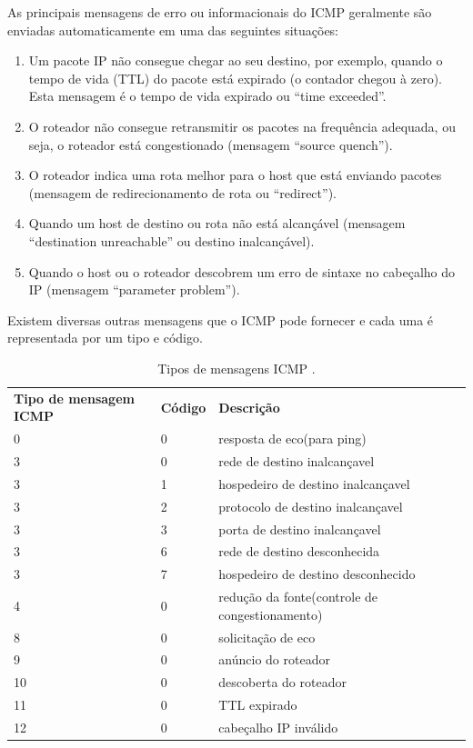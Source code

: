 \documentclass[
	article,			%
	11pt,				%
	oneside,			%
	a4paper,			%
	english,			%
	brazil,				%
	sumario=tradicional
	]{abntex2}
\begin{document}
 As principais mensagens de erro ou informacionais do ICMP geralmente são enviadas automaticamente em uma das seguintes situações:
 \begin{enumerate}
 	\item Um pacote IP não consegue chegar ao seu destino, por exemplo, quando o tempo de vida (TTL) do pacote está expirado (o contador chegou à zero). Esta mensagem é o tempo de vida expirado ou “time exceeded”.
 	
 	\item O roteador não consegue retransmitir os pacotes na frequência adequada, ou seja, o roteador está congestionado (mensagem “source quench”).
 	
 	\item O roteador indica uma rota melhor para o host que está enviando pacotes (mensagem de redirecionamento de rota ou “redirect”).
 	
 	\item Quando um host de destino ou rota não está alcançável (mensagem “destination unreachable” ou destino inalcançável).
 	
 	\item Quando o host ou o roteador descobrem um erro de sintaxe no cabeçalho do IP (mensagem “parameter problem”). 
 \end{enumerate}
	Existem diversas outras mensagens que o ICMP pode fornecer e cada uma é representada por um tipo e código.\cite{dltec}
 \begin{table}[H]
 	\centering
 	\caption{Tipos de mensagens ICMP \cite{Kurose}.}
 	\label{table-ICMP}
 	\begin{tabular}{lllll}
 		\cline{1-3}
\textbf{Tipo de mensagem ICMP} &	\textbf{Código}& \textbf{Descrição}\\ \cline{1-3}
 	    0 &   0&   resposta de eco(para ping)&    \\ \cline{1-3}
 		3 &   0&  rede de destino inalcançavel&    \\ \cline{1-3}
 		3 &   1&  hospedeiro de destino inalcançavel&    \\ \cline{1-3}
 		3 &   2&  protocolo de destino inalcançavel&   \\ \cline{1-3}
 		3 &   3&  porta de destino inalcançavel&    \\ \cline{1-3}
 		3 &   6&  rede de destino desconhecida&    \\ \cline{1-3}
 		3 &   7&  hospedeiro de destino desconhecido&     \\ \cline{1-3}
 		4 &   0&  redução da fonte(controle de congestionamento)&    \\ \cline{1-3}
 		8 &   0&  solicitação de eco&    \\ \cline{1-3}
 		9 &   0&  anúncio do roteador&    \\ \cline{1-3}
 		10 &  0&  descoberta do roteador&    \\ \cline{1-3}
 		11 &  0&  TTL expirado&    \\ \cline{1-3}
 		12 &  0&  cabeçalho IP inválido&    \\ \cline{1-3}
 	\end{tabular}
 \end{table}
\end{document}
